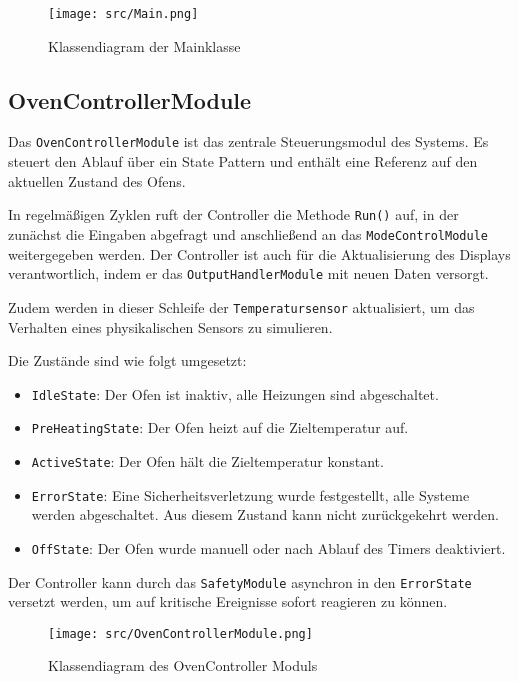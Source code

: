 \documentclass[a4paper,12pt]{article}
\begin{document}
\begin{figure}[h!]
  \centering
  \texttt{[image: src/Main.png]}
  \caption{Klassendiagram der Mainklasse}
  \label{fig:main}
\end{figure}

\newpage

\subsection*{OvenControllerModule}

Das \texttt{OvenControllerModule} ist das zentrale Steuerungsmodul des Systems. Es steuert den Ablauf über ein State Pattern und enthält eine Referenz auf den aktuellen Zustand des Ofens.

In regelmäßigen Zyklen ruft der Controller die Methode \texttt{Run()} auf, in der zunächst die Eingaben abgefragt und anschließend an das \texttt{ModeControlModule} weitergegeben werden. Der Controller ist auch für die Aktualisierung des Displays verantwortlich, indem er das \texttt{OutputHandlerModule} mit neuen Daten versorgt.

Zudem werden in dieser Schleife der \texttt{Temperatursensor} aktualisiert, um das Verhalten eines physikalischen Sensors zu simulieren.

Die Zustände sind wie folgt umgesetzt:

\begin{itemize}
    \item \texttt{IdleState}: Der Ofen ist inaktiv, alle Heizungen sind abgeschaltet.
    \item \texttt{PreHeatingState}: Der Ofen heizt auf die Zieltemperatur auf.
    \item \texttt{ActiveState}: Der Ofen hält die Zieltemperatur konstant.
    \item \texttt{ErrorState}: Eine Sicherheitsverletzung wurde festgestellt, alle Systeme werden abgeschaltet. Aus diesem Zustand kann nicht zurückgekehrt werden.
    \item \texttt{OffState}: Der Ofen wurde manuell oder nach Ablauf des Timers deaktiviert.
\end{itemize}

Der Controller kann durch das \texttt{SafetyModule} asynchron in den \texttt{ErrorState} versetzt werden, um auf kritische Ereignisse sofort reagieren zu können.

\begin{figure}[h!]
  \centering
  \texttt{[image: src/OvenControllerModule.png]}
  \caption{Klassendiagram des OvenController Moduls}
  \label{fig:ovencontrollermodule}
\end{figure}
\end{document}
